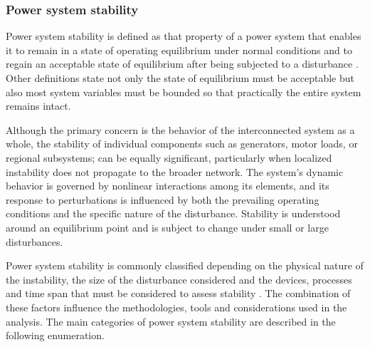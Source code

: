 
\subsubsection{Power system stability}

Power system stability is defined as that property of a power system that enables it to 
remain in a state of operating equilibrium under normal conditions and to regain an acceptable 
state of equilibrium after being subjected to a disturbance \cite{StabilityAndControlKundur}. Other definitions
state not only the state of equilibrium must be acceptable but also most system variables must be 
bounded so that practically the entire system remains intact\cite{KundurDef}.


Although the primary concern is the behavior of the interconnected system as a whole, the stability of individual
components such as generators, motor loads, or regional subsystems; can be equally significant, particularly when 
localized instability does not propagate to the broader network. The system's dynamic behavior is governed by nonlinear 
interactions among its elements, and its response to perturbations is influenced by both the prevailing operating conditions
and the specific nature of the disturbance. Stability is understood around an equilibrium point and is subject to change
under small or large disturbances.

Power system stability is commonly classified depending on the physical nature of the instability, the size of the disturbance 
considered and the devices, processes and time span that must be considered to assess stability \cite{KundurDef}.
The combination of these factors influence the methodologies, tools and considerations used in the analysis. The main categories of power system stability are 
described in the following enumeration.

